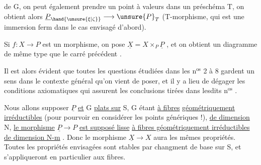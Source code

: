 de G, on peut également prendre un point à valeurs dans un préschéma T,
on obtient alors $\underline{P}_{\hand{\unsure{\xi|\zeta}}} \longrightarrow \unsure{P}_T$ (T-morphisme, qui est une immersion ferm
dans le cas envisagé d'abord).

Si $f:X \longrightarrow P$ est un morphisme, on pose $\underline{X} = X\times_P\underline{P}$ , et on obtient
un diagramme de même type que le carré précédent
.

Il est alors évident que toutes les questions étudiées dans les n$^{\text{os}}$ 2 à 8
gardent un sens dans le contexte général qu'on vient de poser, et il y a
lieu de dégager les conditions axiomatiques qui assurent les conclusions
tirées dans lesdits n$^{\text{os}}$ .

Nous allons supposer $\underline{P}$ \uline{et} G \uline{plats sur} S, G étant \uline{à fibres}
\uline{géométriquement irréductibles} (pour pourvoir en considérer les points
génériques !), \uline{de dimension} N, \uline{le morphisme} $\underline{P} \longrightarrow P$ \uline{est supposé lisse}
\uline{à fibres géométriquement irréductibles de dimension N-m} . Donc le
morphisme $\underline{X} \longrightarrow X$ aura les mêmes propriétés. Toutes les propriétés
envisagées  sont stables par changment de base sur S, et s'appliqueront
en particulier aux fibres.

